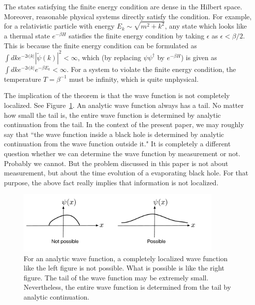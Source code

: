 \documentclass[12pt,a4paper]{article}
\theoremstyle{plain}
\theoremstyle{definition}
\numberwithin{thm}{section}
\begin{document}
The states satisfying the finite energy condition are dense in the Hilbert space. Moreover, reasonable physical systems directly satisfy the condition.
For example, for a relativistic particle with energy $E_k \sim \sqrt{m^2+k^2}$, any state which looks like a thermal state $e^{-\beta H}$ satisfies the finite energy condition
by taking $\epsilon $ as $\epsilon <\beta/2$. This is because the finite energy condition can be formulated as $\int dk e^{-2\epsilon |k|}  |\widetilde{\psi}(k)|^2 < \infty $,
which (by replacing $\psi \psi^\dagger$ by $e^{ - \beta H}$) is given as $\int dk e^{-2\epsilon |k|}  e^{- \beta E_k} < \infty $.
For a system to violate the finite energy condition, the temperature $T=\beta^{-1}$ must be infinity, which is quite unphysical. 

The implication of the theorem is that the wave function is not completely localized.
See Figure~\ref{fig:loc}. An analytic wave function always has a tail.
No matter how small the tail is, the entire wave function is determined by analytic continuation from the tail. 
In the context of the present paper, we may roughly say that ``the wave function inside a black hole is determined by analytic continuation from the wave function
outside it." It is completely a different question whether we can determine the wave function by measurement or not. Probably we cannot.
But the problem discussed in this paper is not about measurement, but about the time evolution of a evaporating black hole.
For that purpose, the above fact really implies that information is not localized.
\begin{figure}
\centering
\includegraphics[width=0.9\textwidth]{localized}
\caption{ For an analytic wave function, a completely localized wave function like the left figure is not possible.
What is possible is like the right figure. The tail of the wave function may be extremely small. Nevertheless,
the entire wave function is determined from the tail by analytic continuation.
 \label{fig:loc}}
\end{figure}
\end{document}
